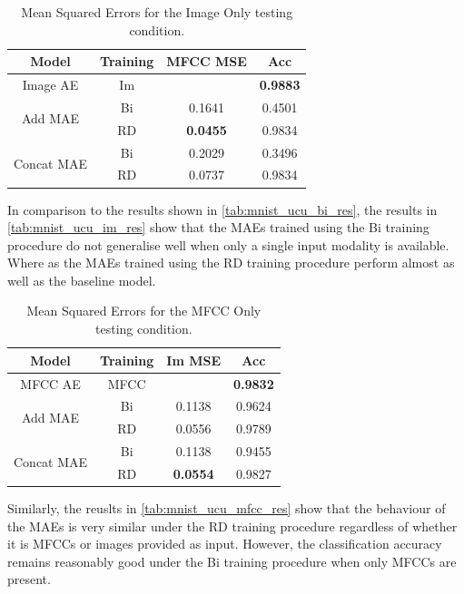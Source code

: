 \begin{table}
	\centering
		\begin{tabular}{|c|c|c|c|}
		\hline
		Model & Training &  MFCC MSE &  Acc \\ \hline
		Image AE & Im 		&  		    			& \textbf{0.9883}	\\ \hline		
\multirow{2}{*}{Add MAE} & Bi & 	0.1641			& 0.4501 			\\ \cline{2-4}
						  & RD & \textbf{0.0455}	& 0.9834 			\\ \hline	
		
\multirow{2}{*}{Concat MAE} & Bi & 	0.2029		&	0.3496 			\\ \cline{2-4}		
							 & RD & 	0.0737		&	0.9834 			\\ \hline
		\end{tabular}
		\caption{Mean Squared Errors for the Image Only testing condition.}
		\label{tab:mnist_ucu_im_res}

\end{table}

In comparison to the results shown in \autoref{tab:mnist_ucu_bi_res}, the results in \autoref{tab:mnist_ucu_im_res} show that the MAEs trained using the Bi training procedure do not generalise well when only a single input modality is available. Where as the MAEs trained using the RD training procedure perform almost as well as the baseline model. 
\begin{table}[h]
	\centering
		\begin{tabular}{|c|c|c|c|}
		\hline
		Model & Training & Im MSE &  Acc \\ \hline
				
				MFCC AE & MFCC & 					& 	\textbf{0.9832}	\\ \hline		
\multirow{2}{*}{Add MAE} & Bi & 	0.1138			& 	0.9624 			\\ \cline{2-4}
						  & RD &	0.0556			&	0.9789			\\ \hline	
		
\multirow{2}{*}{Concat MAE} & Bi &	0.1138			&	0.9455			\\ \cline{2-4}		
							 & RD & \textbf{0.0554}	& 	0.9827 			\\ \hline
		\end{tabular}
		\caption{Mean Squared Errors for the MFCC Only testing condition.}
		\label{tab:mnist_ucu_mfcc_res}

\end{table}

Similarly, the reuslts in \autoref{tab:mnist_ucu_mfcc_res} show that the behaviour of the MAEs is very similar under the RD training procedure regardless of whether it is MFCCs or images provided as input. However, the classification accuracy remains reasonably good under the Bi training procedure when only MFCCs are present. 

